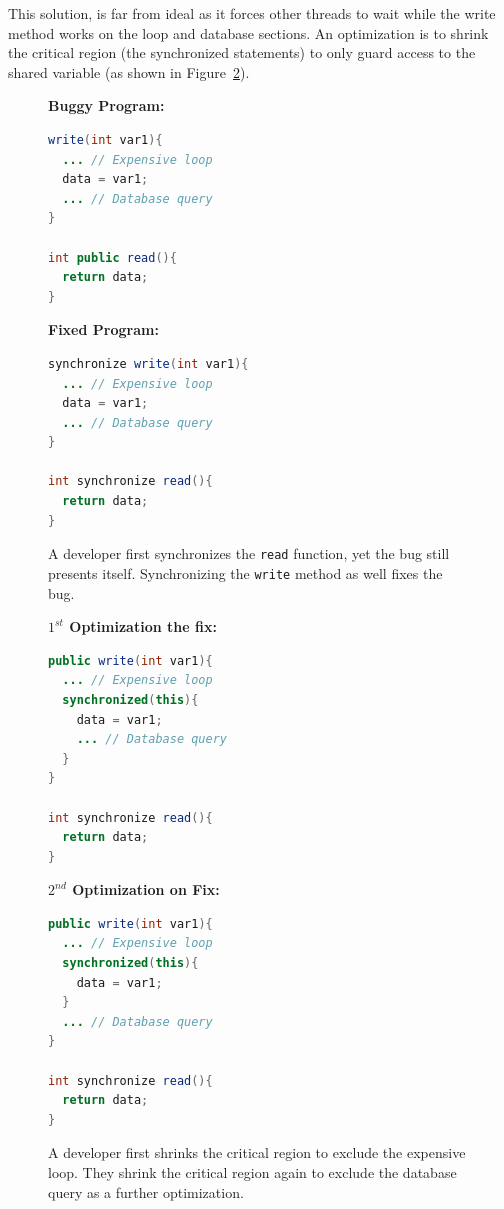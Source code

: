 \documentclass[10pt, conference, compsocconf]{IEEEtran}
\begin{document}
This solution, is far from ideal as it forces other threads to wait while the
write method works on the loop and database sections. An optimization is to
shrink the critical region (the synchronized statements) to only guard access
to the shared variable (as shown in
Figure~\ref{fig:optimized_sample_datarace}).

\begin{figure}[!h]
\vspace{2mm}
\begin{minipage}{3.70cm}
\footnotesize{\textbf{Buggy Program:}}
\begin{lstlisting}[language=Java]
write(int var1){
  ... // Expensive loop
  data = var1;
  ... // Database query
}

int public read(){
  return data;
}
\end{lstlisting}
\end{minipage}\hfill
\begin{minipage}{3.70cm}
\footnotesize{\textbf{Fixed Program:}}
\begin{lstlisting}[language=Java]
synchronize write(int var1){
  ... // Expensive loop
  data = var1;
  ... // Database query
}

int synchronize read(){
  return data;
}
\end{lstlisting}
\end{minipage}
\caption{A developer first synchronizes the \texttt{read} function, yet the bug
still presents itself. Synchronizing the \texttt{write} method as well fixes
the bug.}
\label{fig:fixed_sample_datarace}
\end{figure}

\begin{figure}[!h]
\vspace{2mm}
\begin{minipage}{3.70cm}
\footnotesize{\textbf{$1^{st}$ Optimization the fix:}}
\begin{lstlisting}[language=Java]
public write(int var1){
  ... // Expensive loop
  synchronized(this){
    data = var1;
    ... // Database query
  }
}

int synchronize read(){
  return data;
}
\end{lstlisting}
\end{minipage}\hfill
\begin{minipage}{3.70cm}
\footnotesize{\textbf{$2^{nd}$ Optimization on Fix:}}
\begin{lstlisting}[language=Java]
public write(int var1){
  ... // Expensive loop
  synchronized(this){
    data = var1;
  }
  ... // Database query
}

int synchronize read(){
  return data;
}
\end{lstlisting}
\end{minipage}
\caption{A developer first shrinks the critical region to exclude the expensive
loop. They shrink the critical region again to exclude the database query as a
further optimization.}
\label{fig:optimized_sample_datarace}
\end{figure}
\end{document}
